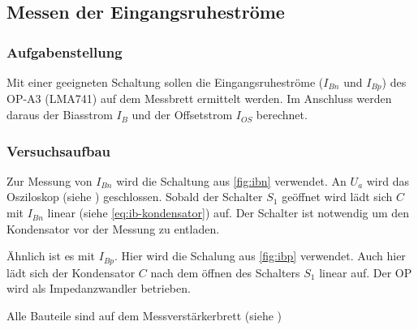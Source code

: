 \newpage
\subsection{Messen der Eingangsruheströme}\label{sec:2-1}
\subsubsection{Aufgabenstellung}

Mit einer geeigneten Schaltung sollen die Eingangsruheströme ($I_{Bn}$ und
$I_{Bp}$) des OP-A3 (LMA741) auf dem Messbrett ermittelt werden. Im Anschluss
werden daraus der Biasstrom $I_B$ und der Offsetstrom $I_{OS}$ berechnet.

\subsubsection{Versuchsaufbau}

Zur Messung von $I_{Bn}$ wird die Schaltung aus \autoref{fig:ibn}
verwendet. An $U_a$ wird das Osziloskop (siehe ) geschlossen.
Sobald der Schalter $S_1$ geöffnet wird lädt sich $C$ mit $I_{Bn}$ linear
(siehe \autoref{eq:ib-kondensator}) auf. Der Schalter ist notwendig um den
Kondensator vor der Messung zu entladen.

Ähnlich ist es mit $I_{Bp}$. Hier wird die Schalung aus \autoref{fig:ibp}
verwendet. Auch hier lädt sich der Kondensator $C$ nach dem öffnen des
Schalters $S_1$ linear auf. Der OP wird als Impedanzwandler betrieben.

Alle Bauteile sind auf dem Messverstärkerbrett (siehe )

